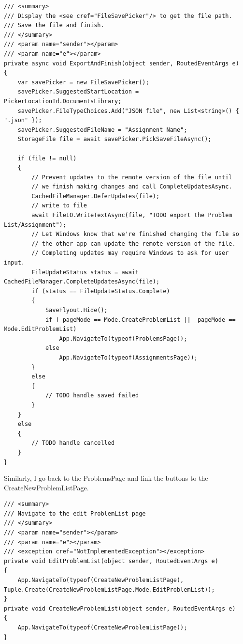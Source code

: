 \documentclass[a4paper]{report}
\begin{document}
\begin{verbatim}
/// <summary>
/// Display the <see cref="FileSavePicker"/> to get the file path.
/// Save the file and finish.
/// </summary>
/// <param name="sender"></param>
/// <param name="e"></param>
private async void ExportAndFinish(object sender, RoutedEventArgs e)
{
    var savePicker = new FileSavePicker();
    savePicker.SuggestedStartLocation = PickerLocationId.DocumentsLibrary;
    savePicker.FileTypeChoices.Add("JSON file", new List<string>() { ".json" });
    savePicker.SuggestedFileName = "Assignment Name";
    StorageFile file = await savePicker.PickSaveFileAsync();

    if (file != null)
    {
        // Prevent updates to the remote version of the file until
        // we finish making changes and call CompleteUpdatesAsync.
        CachedFileManager.DeferUpdates(file);
        // write to file
        await FileIO.WriteTextAsync(file, "TODO export the Problem List/Assignment");
        // Let Windows know that we're finished changing the file so
        // the other app can update the remote version of the file.
        // Completing updates may require Windows to ask for user input.
        FileUpdateStatus status = await CachedFileManager.CompleteUpdatesAsync(file);
        if (status == FileUpdateStatus.Complete)
        {
            SaveFlyout.Hide();
            if (_pageMode == Mode.CreateProblemList || _pageMode == Mode.EditProblemList)
                App.NavigateTo(typeof(ProblemsPage));
            else
                App.NavigateTo(typeof(AssignmentsPage));
        }
        else
        {
            // TODO handle saved failed
        }
    }
    else
    {
        // TODO handle cancelled
    }
}
\end{verbatim}

Similarly, I go back to the ProblemsPage and link the buttons to the CreateNewProblemListPage.

\begin{verbatim}
/// <summary>
/// Navigate to the edit ProblemList page
/// </summary>
/// <param name="sender"></param>
/// <param name="e"></param>
/// <exception cref="NotImplementedException"></exception>
private void EditProblemList(object sender, RoutedEventArgs e)
{
    App.NavigateTo(typeof(CreateNewProblemListPage), Tuple.Create(CreateNewProblemListPage.Mode.EditProblemList));
}
private void CreateNewProblemList(object sender, RoutedEventArgs e)
{
    App.NavigateTo(typeof(CreateNewProblemListPage));
}
\end{verbatim}
\end{document}
